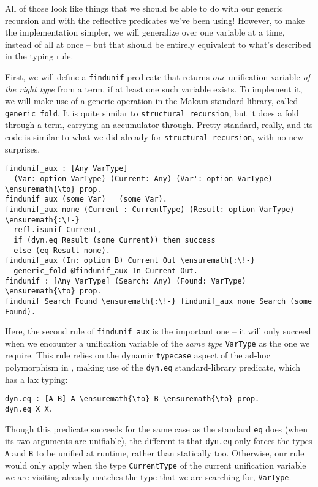 All of those look like things that we should be able to do with our
generic recursion and with the reflective predicates we've been using!
However, to make the implementation simpler, we will generalize over one
variable at a time, instead of all at once -- but that should be
entirely equivalent to what's described in the typing rule.

First, we will define a \texttt{findunif} predicate that returns
\emph{one} unification variable \emph{of the right type} from a term, if
at least one such variable exists. To implement it, we will make use of
a generic operation in the Makam standard library, called
\texttt{generic\_fold}. It is quite similar to
\texttt{structural\_recursion}, but it does a fold through a term,
carrying an accumulator through. Pretty standard, really, and its code
is similar to what we did already for \texttt{structural\_recursion},
with no new surprises.

\begin{verbatim}
findunif_aux : [Any VarType]
  (Var: option VarType) (Current: Any) (Var': option VarType) \ensuremath{\to} prop.
findunif_aux (some Var) _ (some Var).
findunif_aux none (Current : CurrentType) (Result: option VarType) \ensuremath{:\!-}
  refl.isunif Current,
  if (dyn.eq Result (some Current)) then success
  else (eq Result none).
findunif_aux (In: option B) Current Out \ensuremath{:\!-}
  generic_fold @findunif_aux In Current Out.
findunif : [Any VarType] (Search: Any) (Found: VarType) \ensuremath{\to} prop.
findunif Search Found \ensuremath{:\!-} findunif_aux none Search (some Found).
\end{verbatim}

Here, the second rule of \texttt{findunif\_aux} is the important one --
it will only succeed when we encounter a unification variable of the
\emph{same type} \texttt{VarType} as the one we require. This rule
relies on the dynamic \texttt{typecase} aspect of the ad-hoc
polymorphism in \lamprolog, making use of the \texttt{dyn.eq}
standard-library predicate, which has a lax typing:

\begin{verbatim}
dyn.eq : [A B] A \ensuremath{\to} B \ensuremath{\to} prop.
dyn.eq X X.
\end{verbatim}

Though this predicate succeeds for the same case as the standard
\texttt{eq} does (when its two arguments are unifiable), the different
is that \texttt{dyn.eq} only forces the types \texttt{A} and \texttt{B}
to be unified at runtime, rather than statically too. Otherwise, our
rule would only apply when the type \texttt{CurrentType} of the current
unification variable we are visiting already matches the type that we
are searching for, \texttt{VarType}.

